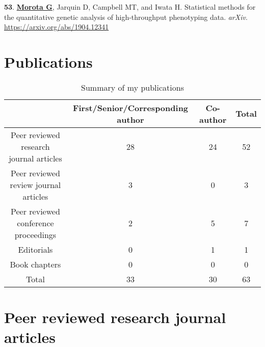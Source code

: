 \documentclass[margin,line,10pt]{res}
\newenvironment{list1}{
  \begin{list}{\ding{113}}{%
      \setlength{\itemsep}{0in}
      \setlength{\parsep}{0in} \setlength{\parskip}{0in}
      \setlength{\topsep}{0in} \setlength{\partopsep}{0in} 
      \setlength{\leftmargin}{0.17in}}}{\end{list}}
\begin{document}
\begin{resume}
\begin{list1}
      \vspace{0.5cm}


\item  [{\bf 53}.] \textbf{\underline{Morota G}}, Jarquin D, Campbell MT, and Iwata H. Statistical methods for the quantitative genetic analysis of high-throughput phenotyping data. \emph{arXiv}.  \textcolor{blue}{\href{https://arxiv.org/abs/1904.12341}{https://arxiv.org/abs/1904.12341}}

 
\end{list1}

  
\vspace{0.5cm}


\section{\sc Publications}
\vspace{1cm}

\begin{table}[h!]
\centering
  \begin{tabular}{ |c|c|c|c| }
 \hline
 & First/Senior/Corresponding author & Co-author & Total \\  \hline
Peer reviewed research journal articles  & 28 & 24 & 52 \\  \hline
Peer reviewed review journal articles  & 3 & 0 & 3 \\  \hline
Peer reviewed conference proceedings & 2 & 5 & 7 \\ \hline
Editorials & 0 & 1 & 1 \\ \hline
Book chapters & 0 & 0 & 0 \\ \hline
Total & 33 &  30 & 63 \\ \hline
  \end{tabular}
    \caption{Summary of my publications}
\end{table}

\vspace{0.5cm}

\section{\sc Peer reviewed research journal articles}

\vspace{1.5cm}


\end{resume}
\end{document}
